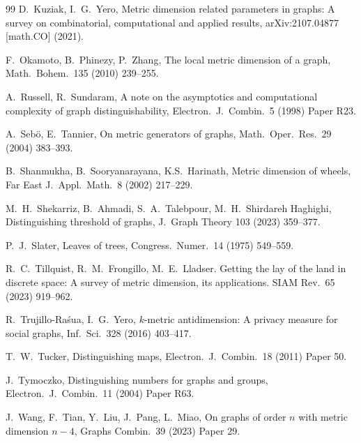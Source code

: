 \documentclass[12pt]{article}
\begin{document}
\begin{thebibliography}{99}
D.~Kuziak, I.~G.~Yero,
Metric dimension related parameters in graphs: A survey on combinatorial, computational and applied results,  
arXiv:2107.04877 [math.CO] (2021). 

F.~Okamoto, B.~Phinezy, P.~Zhang,
The local metric dimension of a graph, 
Math.\ Bohem.\ 135 (2010) 239--255.

A.~Russell, R.~Sundaram, 
A note on the asymptotics and computational complexity of graph distinguishability, 
Electron.\ J.\ Combin.\ 5 (1998) Paper R23. 

A.~Seb\"{o}, E.~Tannier,
On metric generators of graphs, 
Math.\ Oper.\ Res.\ 29 (2004) 383--393.  

B.~Shanmukha, B.~Sooryanarayana, K.S.~Harinath, 
Metric dimension of wheels,
Far East J.\ Appl.\ Math.\ 8 (2002) 217--229. 

M.~H.~Shekarriz, B.~Ahmadi, S.~A.~Talebpour, M.~H.~Shirdareh Haghighi,
Distinguishing threshold of graphs, 
J.\ Graph Theory 103 (2023) 359--377.

P.~J.~Slater, 
Leaves of trees, 
Congress.\ Numer.\ 14 (1975) 549--559. 

R.~C.~Tillquist, R.~M.~Frongillo, M.~E.~Lladser. 
Getting the lay of the land in discrete space: A survey of metric dimension, its applications. 
SIAM Rev.\ 65 (2023) 919--962.

R.~Trujillo-Ra\'{s}ua, I.~G.~Yero,
$k$-metric antidimension: A privacy measure for social graphs, 
Inf.\ Sci.\ 328 (2016) 403--417. 

T.~W.~Tucker,
Distinguishing maps, 
Electron.\ J.\ Combin.\ 18 (2011) Paper 50.  

J.~Tymoczko,
Distinguishing numbers for graphs and groups, 
Electron.\ J.\ Combin.\ 11 (2004) Paper R63.

J.~Wang, F.~Tian, Y.~Liu, J.~Pang, L.~Miao,
On graphs of order $n$ with metric dimension $n - 4$, 
Graphs Combin.\ 39 (2023) Paper 29. 

\end{thebibliography}
\end{document}
